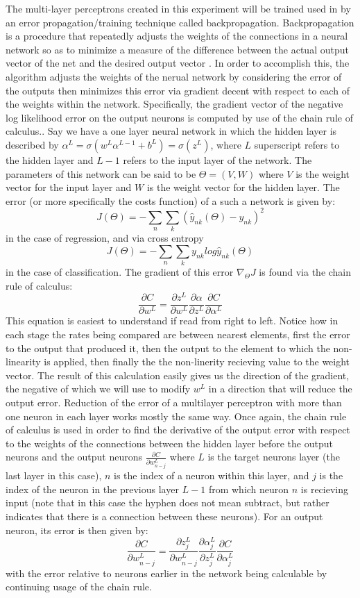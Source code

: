 The multi-layer perceptrons created in this experiment will be trained used in
by an error propagation/training technique called backpropagation.
Backpropagation is a procedure that repeatedly adjusts the weights of the
connections in a neural network so as to minimize a measure of the difference
between the actual output vector of the net and the desired output
vector \cite{Rumelhart}. In order to accomplish this, the algorithm
adjusts the weights of the nerual network by considering the error of
the outputs then minimizes this error via gradient decent with respect
to each of the weights within the network. Specifically, the gradient
vector of the negative log likelihood error on the output neurons is
computed by use of the chain rule of calculus.\cite{Murphy}. Say we
have a one layer neural network in which the hidden layer is described
by $\alpha^{L} = \sigma(w^{L}\alpha^{L-1} + b^{L}) = \sigma(z^{L})$,
where $L$ superscript refers to the hidden layer and $L-1$ refers
to the input layer of the network. The parameters of this network can
be said to be $\Theta = (V,W)$ where $V$ is the weight vector for the input
layer and $W$ is the weight vector for the hidden layer. The error (or
more specifically the costs function) of a such a network is given by:
$$J(\Theta ) = - \sum_n\sum_k(\hat{y}_{nk}(\Theta)-y_{nk})^2$$
in the case of regression, and via cross entropy
$$J(\Theta ) = - \sum_n\sum_ky_{nk}log\hat{y}_{nk}(\Theta)$$
in the case of classification. The gradient of this error $\nabla_{\Theta}J$
is found via the chain rule of calculus:
$$\frac{\partial C}{\partial
w^{L}} = \frac{\partial z^{L}}{\partial
w^{L}}\frac{\partial \alpha}{\partial z^{L}}\frac{\partial
  C}{\partial \alpha^{L}}$$
This equation is easiest to understand if read from right to left.
Notice how in each stage the rates being compared are between nearest
elements, first the error to the output that produced it, then the output
to the element to which the non-linearity is applied, then finally the the
non-linerity recieving value to the weight vector. The result of this
calculation easily gives us the direction of the gradient, the negative of
which we will use to modify $w^{L}$ in a direction that will reduce the output
error. Reduction of the error of a multilayer perceptron with more
than one neuron in each layer works mostly the same way. Once again,
the chain rule of calculus is used in order to find the derivative of
the output error with respect to the weights of the connections
between the hidden layer before the output neurons and the output
neurons $\frac{\partial C}{\partial w^{L}_{n-j}}$ where $L$ is the
target neurons layer (the last layer in this case), $n$ is the index of
a neuron within this layer, and $j$ is the index of the neuron in the
previous layer $L-1$ from which neuron $n$ is recieving input (note
that in this case the hyphen does not mean subtract, but rather
indicates that there is a connection between these neurons). For an output
neuron, its error is then given by:
$$\frac{\partial C}{\partial w^{L}_{n-j}} = \frac{\partial z^{L}_{j}}{\partial w^{L}_{n-j}}\frac{\partial \alpha^{L}_{j}}{\partial z^{L}_{j}}\frac{\partial C}{\partial \alpha^{L}_{j}}$$
with the error relative to neurons earlier in the network being calculable by continuing usage of the chain rule.

